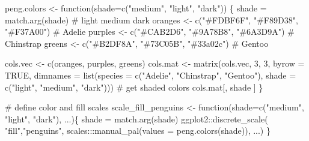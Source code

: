 \documentclass[
  letterpaper,
  10pt,
  krantz2]{krantz}
\makeatletter
\newenvironment{Shaded}{\begin{snugshade}}{\end{snugshade}}
\newcommand{\AttributeTok}[1]{\textcolor[rgb]{0.40,0.45,0.13}{#1}}
\newcommand{\CommentTok}[1]{\textcolor[rgb]{0.37,0.37,0.37}{#1}}
\newcommand{\ConstantTok}[1]{\textcolor[rgb]{0.56,0.35,0.01}{#1}}
\newcommand{\ControlFlowTok}[1]{\textcolor[rgb]{0.00,0.23,0.31}{#1}}
\newcommand{\DecValTok}[1]{\textcolor[rgb]{0.68,0.00,0.00}{#1}}
\newcommand{\FunctionTok}[1]{\textcolor[rgb]{0.28,0.35,0.67}{#1}}
\newcommand{\NormalTok}[1]{\textcolor[rgb]{0.00,0.23,0.31}{#1}}
\newcommand{\OtherTok}[1]{\textcolor[rgb]{0.00,0.23,0.31}{#1}}
\newcommand{\SpecialCharTok}[1]{\textcolor[rgb]{0.37,0.37,0.37}{#1}}
\newcommand{\StringTok}[1]{\textcolor[rgb]{0.13,0.47,0.30}{#1}}
\newenvironment{kframe}{%
  \medskip{}
  \setlength{\fboxsep}{.8em}
  \def\at@end@of@kframe{}%
  \ifinner\ifhmode%
  \def\at@end@of@kframe{\end{minipage}}%
  \begin{minipage}{\columnwidth}%
  \fi\fi%
  \def\FrameCommand##1{\hskip\@totalleftmargin \hskip-\fboxsep
  \colorbox{shadecolor}{##1}\hskip-\fboxsep
      \hskip-\linewidth \hskip-\@totalleftmargin \hskip\columnwidth}%
  \MakeFramed {\advance\hsize-\width
    \@totalleftmargin\z@ \linewidth\hsize
    \@setminipage}}%
{\par\unskip\endMakeFramed%
  \at@end@of@kframe}
\renewenvironment{Shaded}{\begin{kframe}}{\end{kframe}}
\makeatother
\begin{document}
\begin{Shaded}
\begin{Highlighting}[]
\NormalTok{peng.colors }\OtherTok{\textless{}{-}} \ControlFlowTok{function}\NormalTok{(}\AttributeTok{shade=}\FunctionTok{c}\NormalTok{(}\StringTok{"medium"}\NormalTok{, }\StringTok{"light"}\NormalTok{, }\StringTok{"dark"}\NormalTok{)) \{}
\NormalTok{  shade }\OtherTok{=} \FunctionTok{match.arg}\NormalTok{(shade)}
  \CommentTok{\#             light      medium     dark}
\NormalTok{  oranges }\OtherTok{\textless{}{-}} \FunctionTok{c}\NormalTok{(}\StringTok{"\#FDBF6F"}\NormalTok{, }\StringTok{"\#F89D38"}\NormalTok{, }\StringTok{"\#F37A00"}\NormalTok{)  }\CommentTok{\# Adelie}
\NormalTok{  purples }\OtherTok{\textless{}{-}} \FunctionTok{c}\NormalTok{(}\StringTok{"\#CAB2D6"}\NormalTok{, }\StringTok{"\#9A78B8"}\NormalTok{, }\StringTok{"\#6A3D9A"}\NormalTok{)  }\CommentTok{\# Chinstrap}
\NormalTok{  greens }\OtherTok{\textless{}{-}}  \FunctionTok{c}\NormalTok{(}\StringTok{"\#B2DF8A"}\NormalTok{, }\StringTok{"\#73C05B"}\NormalTok{, }\StringTok{"\#33a02c"}\NormalTok{)  }\CommentTok{\# Gentoo}
  
\NormalTok{  cols.vec }\OtherTok{\textless{}{-}} \FunctionTok{c}\NormalTok{(oranges, purples, greens)}
\NormalTok{  cols.mat }\OtherTok{\textless{}{-}} 
    \FunctionTok{matrix}\NormalTok{(cols.vec, }\DecValTok{3}\NormalTok{, }\DecValTok{3}\NormalTok{, }
           \AttributeTok{byrow =} \ConstantTok{TRUE}\NormalTok{,}
           \AttributeTok{dimnames =} \FunctionTok{list}\NormalTok{(}\AttributeTok{species =} \FunctionTok{c}\NormalTok{(}\StringTok{"Adelie"}\NormalTok{, }\StringTok{"Chinstrap"}\NormalTok{, }\StringTok{"Gentoo"}\NormalTok{),}
                           \AttributeTok{shade =} \FunctionTok{c}\NormalTok{(}\StringTok{"light"}\NormalTok{, }\StringTok{"medium"}\NormalTok{, }\StringTok{"dark"}\NormalTok{)))}
  \CommentTok{\# get shaded colors}
\NormalTok{  cols.mat[, shade ]}
\NormalTok{\}}

\CommentTok{\# define color and fill scales}
\NormalTok{scale\_fill\_penguins }\OtherTok{\textless{}{-}} \ControlFlowTok{function}\NormalTok{(}\AttributeTok{shade=}\FunctionTok{c}\NormalTok{(}\StringTok{"medium"}\NormalTok{, }\StringTok{"light"}\NormalTok{, }\StringTok{"dark"}\NormalTok{), ...)\{}
\NormalTok{  shade }\OtherTok{=} \FunctionTok{match.arg}\NormalTok{(shade)}
\NormalTok{  ggplot2}\SpecialCharTok{::}\FunctionTok{discrete\_scale}\NormalTok{(}
    \StringTok{"fill"}\NormalTok{,}\StringTok{"penguins"}\NormalTok{,}
\NormalTok{     scales}\SpecialCharTok{:::}\FunctionTok{manual\_pal}\NormalTok{(}\AttributeTok{values =} \FunctionTok{peng.colors}\NormalTok{(shade)), ...)}
\NormalTok{\}}


\end{Highlighting}
\end{Shaded}
\end{document}
